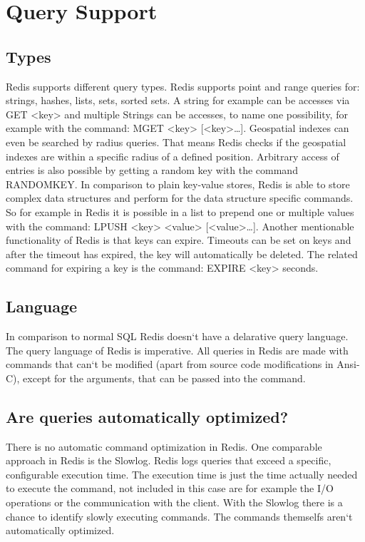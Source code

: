 \chapter{Query Support}

\section{Types}
Redis supports different query types. Redis supports point and range queries for:
strings, hashes, lists, sets, sorted sets. A string for example can be accesses via GET <key> and multiple Strings can be accesses, to name one possibility, for example with the command: MGET <key> [<key>…]. Geospatial indexes can even be searched by radius queries. That means Redis checks if the geospatial indexes are within a specific radius of a defined
position. Arbitrary access of entries is also possible by getting a random key with the command RANDOMKEY. In comparison to plain key-value stores, Redis is able to store complex data structures and perform for the data structure specific commands. So for example in Redis it is possible in a list to prepend one or multiple values with the command: LPUSH <key> <value> [<value>…]. Another mentionable functionality of Redis is that keys can expire. Timeouts can be set on keys and after the timeout has expired, the key will automatically be deleted. The related command for expiring a key is the command: EXPIRE <key> {seconds}.

\section{Language}
In comparison to normal SQL Redis doesn‘t have a delarative query language. The query language of Redis is imperative. All queries in Redis are made with commands that can‘t be modified (apart from source code modifications in Ansi-C), except for the arguments, that can be passed into the command.

\section{Are queries automatically optimized?}
There is no automatic command optimization in Redis. One comparable approach in Redis is the Slowlog. Redis logs queries that exceed a specific, configurable execution time. The execution time is just the time actually needed to execute the command, not included in this case are for example the I/O operations or the communication with the client. With the Slowlog there is a chance to identify slowly executing commands. The commands themselfs aren‘t automatically optimized.
